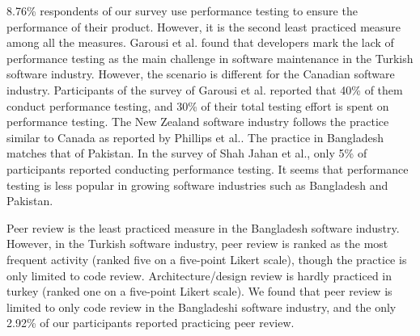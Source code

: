 8.76\% respondents of our survey use performance testing to ensure the performance of their product.  However, it is the second least practiced measure among all the measures. Garousi et al.\citep{Garousi2015} found that developers mark the lack of performance testing as the main challenge in software maintenance in the Turkish software industry. However, the scenario is different for the Canadian software industry. Participants of the survey of Garousi et al.\citep{Garousi2013} reported that 40\% of them conduct performance testing, and 30\% of their total testing effort is spent on performance testing. The New Zealand software industry follows the practice similar to Canada as reported by Phillips et al.\citep{Phillips2003}. %
The practice in Bangladesh matches that of Pakistan. 
In the survey of Shah Jahan et al.\citep{Jahan2019}, only 5\% of participants reported conducting performance testing. It seems that performance testing is less popular in growing software industries such as Bangladesh and Pakistan.

Peer review is the least practiced measure in the Bangladesh software industry. However, in the Turkish software industry, peer review is ranked as the most frequent activity\citep{Garousi2015} (ranked five on a five-point Likert scale), though the practice is only limited to code review. Architecture/design review is hardly practiced in turkey (ranked one on a five-point Likert scale). We found that peer review is limited to only code review in the Bangladeshi software industry, and the only 2.92\% of our participants reported practicing peer review.

